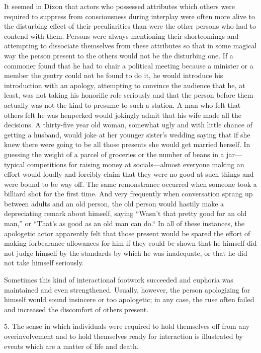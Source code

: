 \documentclass[twoside,symmetric,nobib,justified]{tufte-book}
\begin{document}
It seemed in Dixon that actors who possessed attributes which others
were required to suppress from consciousness during interplay were often
more alive to the disturbing effect of their peculiarities than were the
other persons who had to contend with them. Persons were always
mentioning their shortcomings and attempting to dissociate themselves
from these attributes so that in some magical way the person present to
the others would not be the disturbing one. If a commoner found that he
had to chair a political meeting because a minister or a member the
gentry could not be found to do it, he would introduce his introduction
with an apology, attempting to convince the audience that he, at least,
was not taking his honorific role seriously and that the person before
them actually was not the kind to presume to such a station. A man who
felt that others felt he was henpecked would jokingly admit that his
wife made all the decisions. A thirty-five year old woman, somewhat ugly
and with little chance of getting a husband, would joke at her younger
sister's wedding saying that if she knew there were going to be all
those presents she would get married herself. In guessing the weight of
a parcel of groceries or the number of beans in a jar---typical
competitions for raising money at socials---almost everyone making an
effort would loudly and forcibly claim that they were no good at such
things and were bound to be way off. The same remonstrance occurred when
someone took a billiard shot for the first time. And very frequently
when conversation sprang up between adults and an old person, the old
person would hastily make a depreciating remark about himself, saying
``Wasn't that pretty good for an old man,'' or ``That's as good as an
old man can do.`` In all of these instances, the apologetic actor
apparently felt that those present would be spared the effort of making
forbearance allowances for him if they could be shown that he himself
did not judge himself by the standards by which he was inadequate, or
that he did not take himself seriously.

Sometimes this kind of interactional footwork succeeded and euphoria was
maintained and even strengthened. Usually, however, the person
apologizing for himself would sound insincere or too apologetic; in any
case, the ruse often failed and increased the discomfort of others
present.

5. The sense in which individuals were required to hold themselves off
from any overinvolvement and to hold themselves ready for interaction is
illustrated by events which are a matter of life and death.
\end{document}
